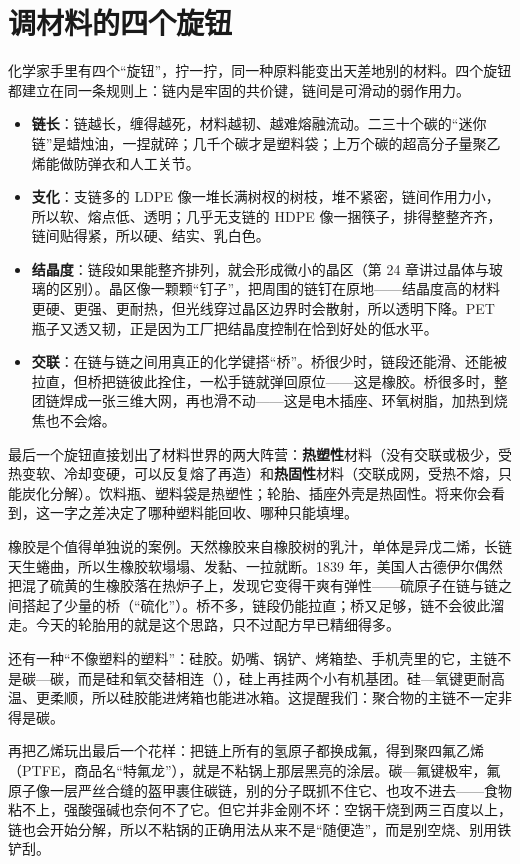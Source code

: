 \section{调材料的四个旋钮}

化学家手里有四个“旋钮”，拧一拧，同一种原料能变出天差地别的材料。四个旋钮都建立在同一条规则上：链内是牢固的共价键，链间是可滑动的弱作用力。

\begin{itemize}[itemsep=2pt]
\item \textbf{链长}：链越长，缠得越死，材料越韧、越难熔融流动。二三十个碳的“迷你链”是蜡烛油，一捏就碎；几千个碳才是塑料袋；上万个碳的超高分子量聚乙烯能做防弹衣和人工关节。
\item \textbf{支化}：支链多的 LDPE 像一堆长满树杈的树枝，堆不紧密，链间作用力小，所以软、熔点低、透明；几乎无支链的 HDPE 像一捆筷子，排得整整齐齐，链间贴得紧，所以硬、结实、乳白色。
\item \textbf{结晶度}：链段如果能整齐排列，就会形成微小的晶区（第 24 章讲过晶体与玻璃的区别）。晶区像一颗颗“钉子”，把周围的链钉在原地——结晶度高的材料更硬、更强、更耐热，但光线穿过晶区边界时会散射，所以透明下降。PET 瓶子又透又韧，正是因为工厂把结晶度控制在恰到好处的低水平。
\item \textbf{交联}：在链与链之间用真正的化学键搭“桥”。桥很少时，链段还能滑、还能被拉直，但桥把链彼此拴住，一松手链就弹回原位——这是橡胶。桥很多时，整团链焊成一张三维大网，再也滑不动——这是电木插座、环氧树脂，加热到烧焦也不会熔。
\end{itemize}

最后一个旋钮直接划出了材料世界的两大阵营：\textbf{热塑性}材料（没有交联或极少，受热变软、冷却变硬，可以反复熔了再造）和\textbf{热固性}材料（交联成网，受热不熔，只能炭化分解）。饮料瓶、塑料袋是热塑性；轮胎、插座外壳是热固性。将来你会看到，这一字之差决定了哪种塑料能回收、哪种只能填埋。

橡胶是个值得单独说的案例。天然橡胶来自橡胶树的乳汁，单体是异戊二烯，长链天生蜷曲，所以生橡胶软塌塌、发黏、一拉就断。1839 年，美国人古德伊尔偶然把混了硫黄的生橡胶落在热炉子上，发现它变得干爽有弹性——硫原子在链与链之间搭起了少量的桥（“硫化”）。桥不多，链段仍能拉直；桥又足够，链不会彼此溜走。今天的轮胎用的就是这个思路，只不过配方早已精细得多。

还有一种“不像塑料的塑料”：硅胶。奶嘴、锅铲、烤箱垫、手机壳里的它，主链不是碳—碳，而是硅和氧交替相连（），硅上再挂两个小有机基团。硅—氧键更耐高温、更柔顺，所以硅胶能进烤箱也能进冰箱。这提醒我们：聚合物的主链不一定非得是碳。

再把乙烯玩出最后一个花样：把链上所有的氢原子都换成氟，得到聚四氟乙烯（PTFE，商品名“特氟龙”），就是不粘锅上那层黑亮的涂层。碳—氟键极牢，氟原子像一层严丝合缝的盔甲裹住碳链，别的分子既抓不住它、也攻不进去——食物粘不上，强酸强碱也奈何不了它。但它并非金刚不坏：空锅干烧到两三百度以上，链也会开始分解，所以不粘锅的正确用法从来不是“随便造”，而是别空烧、别用铁铲刮。

